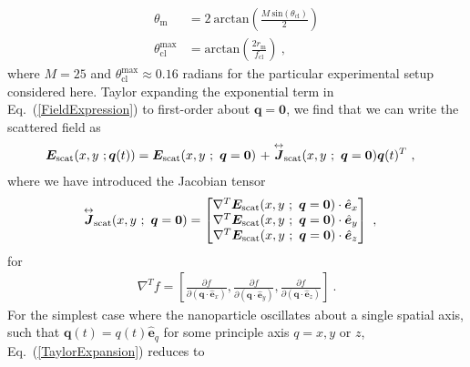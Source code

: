 \documentclass[%
 reprint,
 amsmath,amssymb,
 aps,
pra,
]{revtex4-2}
\begin{document}
\begin{align}
    \theta_{\mathrm{m}} &= 2~\mathrm{arctan}\left(\frac{M~\mathrm{sin}(\theta_{\mathrm{cl}})}{2}\right) \\
    \theta_{\mathrm{cl}}^{\mathrm{max}} &= \mathrm{arctan}\left(\frac{2r_{\mathrm{m}}}{f_{\mathrm{cl}}}\right) ~ ,
\end{align}
where $M=25$ and $\theta_{\mathrm{cl}}^{\mathrm{max}} \approx 0.16$ radians for the particular experimental setup considered here. Taylor expanding the exponential term in Eq.~(\ref{FieldExpression}) to first-order about $\boldsymbol{q}=\boldsymbol{0}$, we find that we can write the scattered field as
\begin{align}\label{TaylorExpansion}
    \boldsymbol{E}_{\mathrm{scat}}(x, y~; \boldsymbol{q}(t)) &= \boldsymbol{E}_{\mathrm{scat}}(x, y ~;~ \boldsymbol{q} = \boldsymbol{0})~+ \stackrel{\leftrightarrow}{\hidewidth\boldsymbol{J}}_{\mathrm{scat}}\hspace{-1mm}(x, y ~;~ \boldsymbol{q} = \boldsymbol{0}) \boldsymbol{q}(t)^{T} ~ ,
\end{align}
where we have introduced the Jacobian tensor
\begin{align}
    \stackrel{\leftrightarrow}{\hidewidth\boldsymbol{J}}_{\mathrm{scat}}\hspace{-1mm}(x, y ~;~ \boldsymbol{q} = \boldsymbol{0}) &= \begin{bmatrix}
        \nabla^{T}\boldsymbol{E}_{\mathrm{scat}}(x, y ~;~ \boldsymbol{q} = \boldsymbol{0}) \cdot \hat{\boldsymbol{e}}_{x} \\
        \nabla^{T}\boldsymbol{E}_{\mathrm{scat}}(x, y ~;~ \boldsymbol{q} = \boldsymbol{0}) \cdot \hat{\boldsymbol{e}}_{y} \\
        \nabla^{T}\boldsymbol{E}_{\mathrm{scat}}(x, y ~;~ \boldsymbol{q} = \boldsymbol{0}) \cdot \hat{\boldsymbol{e}}_{z}
    \end{bmatrix} ~ ,
\end{align}
for 
\begin{align}
    \nabla^{T}f = \left[\frac{\partial f}{\partial(\boldsymbol{q}\cdot\hat{\boldsymbol{e}}_{x})}, \frac{\partial f}{\partial(\boldsymbol{q}\cdot\hat{\boldsymbol{e}}_{y})}, \frac{\partial f}{\partial(\boldsymbol{q}\cdot\hat{\boldsymbol{e}}_{z})}\right] ~ .
\end{align}
For the simplest case where the nanoparticle oscillates about a single spatial axis, such that $\boldsymbol{q}(t) = q(t)\hat{\boldsymbol{e}}_{q}$ for some principle axis $q = x, y$ or $z$, Eq.~(\ref{TaylorExpansion}) reduces to
\end{document}
